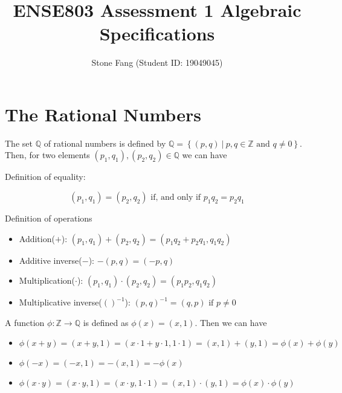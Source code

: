\documentclass[
  a4paper,
]{article}
\title{ENSE803 Assessment 1 Algebraic Specifications}
\author{Stone Fang (Student ID: 19049045)}
\date{}
\begin{document}
\maketitle

\hypertarget{the-rational-numbers}{%
\section{The Rational Numbers}\label{the-rational-numbers}}

The set \(\mathbb{Q}\) of rational numbers is defined by
\(\mathbb{Q}= \left\{ (p, q)~|~p, q \in \mathbb{Z}\mbox{~and~} q \neq 0 \right\}\).
Then, for two elements \((p_1, q_1), (p_2, q_2) \in \mathbb{Q}\) we can
have

Definition of equality:

\[ (p_1, q_1) = (p_2, q_2) \mbox{~if, and only if~} p_1 q_2 = p_2 q_1 \]

Definition of operations

\begin{itemize}
\item
  Addition(\(+\)):
  \((p_1, q_1) + (p_2, q_2) = (p_1 q_2 + p_2 q_1, q_1 q_2)\)
\item
  Additive inverse(\(-\)): \(- (p, q) = (-p, q)\)
\item
  Multiplication(\(\cdot\)):
  \((p_1, q_1) \cdot (p_2, q_2) = (p_1 p_2, q_1 q_2)\)
\item
  Multiplicative inverse(\(()^{-1}\)):
  \((p, q)^{-1} = (q, p) \mbox{~if~} p \neq 0\)
\end{itemize}

A function \(\phi: \mathbb{Z}\rightarrow \mathbb{Q}\) is defined as
\(\phi(x) = (x, 1)\). Then we can have

\begin{itemize}
\item
  \(\phi(x+y) = (x+y, 1) = (x \cdot 1 + y \cdot 1, 1 \cdot 1) = (x, 1) + (y, 1) = \phi(x) + \phi(y)\)
\item
  \(\phi(-x) = (-x, 1) = -(x, 1) = -\phi(x)\)
\item
  \(\phi(x \cdot y) = (x \cdot y, 1) = (x \cdot y, 1 \cdot 1) = (x, 1) \cdot (y, 1) = \phi(x) \cdot \phi(y)\)
\end{itemize}

\printbibliography
\end{document}
